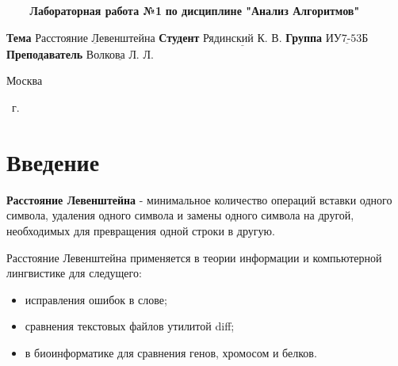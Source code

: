 \documentclass[12pt]{report}
\begin{document}
\begin{center}
	\noindent\begin{minipage}{1.3\textwidth}\centering
	\Large\textbf{   ~~~ Лабораторная работа №1}\newline
	\textbf{по дисциплине "Анализ Алгоритмов"}\newline\newline\newline
	\end{minipage}
\end{center}

\noindent\textbf{Тема} $\underline{\text{Расстояние Левенштейна}}$\newline\newline
\noindent\textbf{Студент} $\underline{\text{Рядинский К. В.}}$\newline\newline
\noindent\textbf{Группа} $\underline{\text{ИУ7-53Б}}$\newline\newline
\noindent\textbf{Преподаватель} $\underline{\text{Волкова Л. Л.}}$\newline

\begin{center}
	\mbox{}
	\vfill
	Москва
\end{center}

\begin{center}
	\the\year ~г.
\end{center}
\clearpage


\tableofcontents
\newpage

\chapter*{Введение}
	
\textbf{Расстояние Левенштейна} - минимальное количество операций вставки одного символа, удаления одного символа и замены одного символа на другой, необходимых для превращения одной строки в другую.

Расстояние Левенштейна применяется в теории информации и компьютерной лингвистике для следущего:

\begin{itemize}
	\item исправления ошибок в слове;
	\item сравнения текстовых файлов утилитой diff;
	\item в биоинформатике для сравнения генов, хромосом и белков.
\end{itemize}
\end{document}
